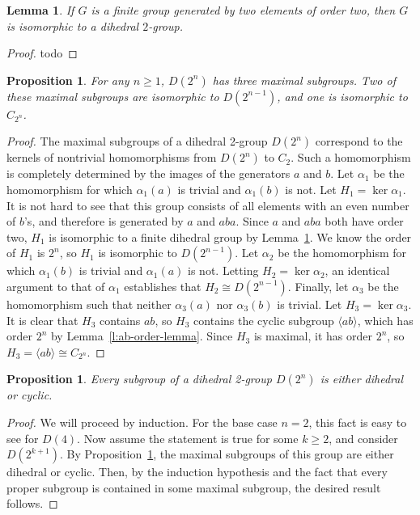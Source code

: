 \documentclass{amsart}
\numberwithin{equation} {section}
\newtheorem{lemma}[equation]{Lemma}
\newtheorem{proposition}[equation]{Proposition}
\theoremstyle{definition}
\begin{document}
\begin{lemma}\label{l:dihedral-structure-lemma}
If $G$ is a finite group generated by two elements of order two, then $G$ is isomorphic to a dihedral $2$-group. 
\end{lemma}

\begin{proof}
todo
\end{proof}

\begin{proposition}\label{p:dihedral-maximal-subgroups}
For any $n \geq 1$, $D(2^n)$ has three maximal subgroups. Two of these maximal subgroups are isomorphic to $D(2^{n-1})$, and one is isomorphic to $C_{2^n}$.
\end{proposition}

\begin{proof}
The maximal subgroups of a dihedral 2-group $D(2^n)$ correspond to  the kernels of nontrivial homomorphisms from $D(2^n)$ to $C_2$. Such a homomorphism is completely determined by the images of the generators $a$ and $b$. Let $\alpha_1$ be the homomorphism for which $\alpha_1(a)$ is trivial and $\alpha_1(b)$ is not. Let $H_1 = \ker \alpha_1$. It is not hard to see that this group consists of all elements with an even number of $b$'s, and therefore is generated by $a$ and $aba$. Since $a$ and $aba$ both have order two, $H_1$ is isomorphic to a finite dihedral group by Lemma~\ref{l:dihedral-structure-lemma}. We know the order of $H_1$ is $2^n$, so $H_1$ is isomorphic to $D(2^{n-1})$. Let $\alpha_2$ be the homomorphism for which $\alpha_1(b)$ is trivial and $\alpha_1(a)$ is not. Letting $H_2 = \ker \alpha_2$, an identical argument to that of $\alpha_1$ establishes that $H_2 \cong D(2^{n-1})$. Finally, let $\alpha_3$ be the homomorphism such that neither $\alpha_3(a)$ nor $\alpha_3(b)$ is trivial. Let $H_3 = \ker \alpha_3$. It is clear that $H_3$ contains $ab$, so $H_3$ contains the cyclic subgroup $\langle ab \rangle$, which has order $2^n$ by Lemma~\ref{l:ab-order-lemma}. Since $H_3$ is maximal, it has order $2^n$, so $H_3 = \langle ab \rangle \cong C_{2^n}$. 
\end{proof}


\begin{proposition}\label{p:dihedral-or-cyclic}
Every subgroup of a dihedral 2-group $D(2^n)$ is either dihedral or cyclic.
\end{proposition}

\begin{proof}
We will proceed by induction. For the base case $n = 2$, this fact is easy to see for $D(4)$. Now assume the statement is true for some $k \geq 2$, and consider $D(2^{k+1})$. By Proposition~\ref{p:dihedral-maximal-subgroups}, the maximal subgroups of this group are either dihedral or cyclic. Then, by the induction hypothesis and the fact that every proper subgroup is contained in some maximal subgroup, the desired result follows. 
\end{proof}
\end{document}

